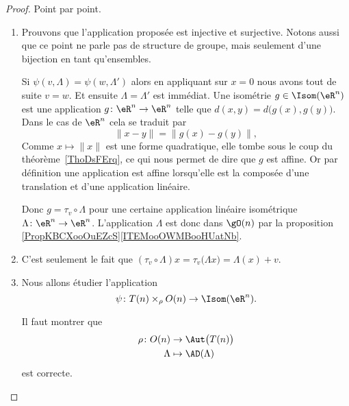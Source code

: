 \begin{proof}
	Point par point.
	\begin{enumerate}
		\item
		      Prouvons que l'application proposée est injective et surjective. Notons aussi que ce point ne parle pas de structure de groupe, mais seulement d'une bijection en tant qu'ensembles.
		      \begin{subproof}
			      \spitem[Injection]
			      Si \( \psi(v,\Lambda)=\psi(w,\Lambda')\) alors en appliquant sur \( x=0\) nous avons tout de suite \( v=w\). Et ensuite \( \Lambda=\Lambda'\) est immédiat.
			      \spitem[Surjection]
			      Une isométrie \( g\in\Isom(\eR^n)\) est une application \( g\colon \eR^n\to \eR^n\) telle que \( d(x,y)=d\big( g(x),g(y) \big)\). Dans le cas de \( \eR^n\) cela se traduit par
			      \begin{equation}
				      \| x-y \|=\big\| g(x)-g(y) \big\|,
			      \end{equation}
			      Comme \( x\mapsto\| x \|\) est une forme quadratique, elle tombe sous le coup du théorème~\ref{ThoDsFErq}, ce qui nous permet de dire que \( g\) est affine. Or par définition une application est affine lorsqu'elle est la composée d'une translation et d'une application linéaire.

			      Donc \( g=\tau_v\circ \Lambda\) pour une certaine application linéaire isométrique \( \Lambda\colon \eR^n\to \eR^n\). L'application \( \Lambda\) est donc dans \( \gO(n)\) par la proposition \ref{PropKBCXooOuEZcS}\ref{ITEMooOWMBooHUatNb}.
		      \end{subproof}
		\item
		      C'est seulement le fait que \( (\tau_v\circ\Lambda)x=\tau_v\big( \Lambda x \big)=\Lambda(x)+v\).
		\item
		      Nous allons étudier l'application
		      \begin{equation}
			      \psi\colon T(n)\times_{\rho}O(n)\to \Isom(\eR^n).
		      \end{equation}
		      \begin{subproof}
			      Il faut montrer que
			      \begin{equation}
				      \begin{aligned}
					      \rho\colon O(n) & \to \Aut\big( T(n) \big) \\
					      \Lambda         & \mapsto \AD(\Lambda)
				      \end{aligned}
			      \end{equation}
			      est correcte.


\end{subproof}
\end{enumerate}
\end{proof}
